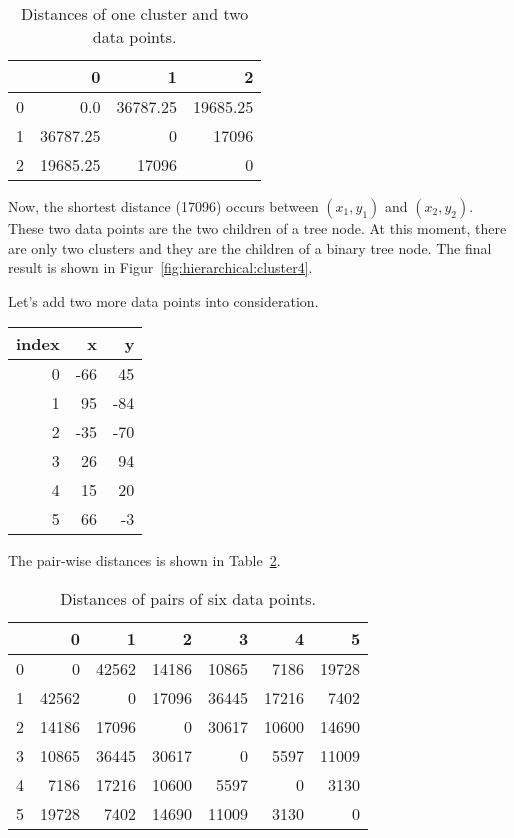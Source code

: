 \begin{table}
  \begin{tt}
\begin{tabular}{|r|rrr|}  \hline
& 0 & 1 & 2   \\ \hline

0 & 0.0 & 36787.25 & 19685.25 \\
1 & 36787.25 & 0 & 17096 \\
2 & 19685.25 & 17096 & 0 \\ \hline
\end{tabular}
  \end{tt}
  \caption{Distances of one cluster and two  data points.}
  \label{table:hierarchical:distance3}
\end{table}

Now, the shortest distance (17096) occurs between $(x_1, y_1)$ and
$(x_2, y_2)$.  These two data points are the two children of a tree
node.  At this moment, there are only two clusters and they are the
children of a binary tree node.  The final result is shown in
Figur~\ref{fig:hierarchical:cluster4}.

Let's add two more data points into consideration.

\begin{table}[h]
\begin{tt}
\begin{tabular}{|r|rr|} \hline
{\bf index} &  {\bf x} & {\bf y} \\ \hline
0 & -66 &  45 \\
1 & 95  &  -84 \\
2 & -35  &  -70 \\
3 & 26  &  94 \\
4 & 15 & 20 \\
5 & 66 & -3 \\ \hline
\end{tabular}
\end{tt}
\end{table}

The pair-wise distances is shown in
Table~\ref{table:hierarchical:distance6points}.

\begin{table}
  \begin{tt}
\begin{tabular}{|r|rrrrrr|}  \hline
& 0 & 1 & 2 & 3 & 4 & 5 \\ \hline

0 & 0& 42562& 14186& 10865 & 7186 & 19728\\
1 & 42562& 0& 17096& 36445 & 17216 & 7402\\
2 & 14186& 17096& 0& 30617 & 10600 & 14690\\
  3 & 10865& 36445& 30617& 0 & 5597 & 11009 \\
  4 & 7186 & 17216 & 10600 & 5597 & 0 & 3130 \\ 
  5 & 19728 & 7402 & 14690 & 11009 & 3130 & 0   \\ \hline
\end{tabular}
  \end{tt}
  \caption{Distances of pairs of six data points.}
  \label{table:hierarchical:distance6points}
\end{table}

